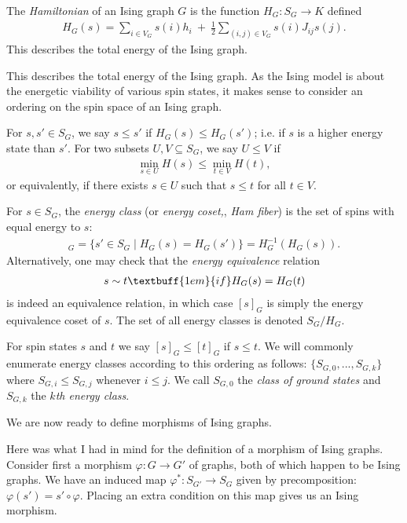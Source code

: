 \begin{defn}\label{defn:hamiltonian}
	The \emph{Hamiltonian} of an Ising graph $G$ is the function $H_G:S_G\to K$ defined
	\begin{align*}
		H_G(s) = \sum_{i \in V_G} s(i)h_i ~+~ \frac{1}{2} \sum_{(i,j) \in V_G} s(i)J_{ij}s(j).
	\end{align*}
	This describes the total energy of the Ising graph.
\end{defn}
This describes the total energy of the Ising graph. As the Ising model is about the energetic viability of various spin states, it makes sense to consider an ordering on the spin space of an Ising graph.
\begin{defn}\label{defn:ordering-on-spins}
	For $s,s' \in S_G$, we say $s\leq s'$ if $H_G(s) \leq H_G(s')$; i.e. if $s$ is a higher energy state than $s'$. For two subsets $U,V \subseteq S_G$, we say $U\leq V$ if
	\begin{align*}
		\min_{s \in U} H(s) \leq \min_{t\in V} H(t),
	\end{align*}
	or equivalently, if there exists $s \in U$ such that $s \leq t$ for all $t \in V$.
\end{defn}
\begin{defn}\label{defn:energy-states}
	For $s\in S_G$, the \emph{energy class} (or \emph{energy coset,}, \emph{Ham fiber}) is the set of spins with equal energy to $s$:
	\begin{align*}
		[s]_{G} = \{s' \in S_G \mid H_G(s) = H_G(s')\} = H_{G}^{-1}(H_G(s)).
	\end{align*}
	Alternatively, one may check that the \emph{energy equivalence} relation
	\begin{align*}
		s \sim t \textbuff{1em}{if} H_G(s) = H_G(t)
	\end{align*}
	is indeed an equivalence relation, in which case $[s]_G$ is simply the energy equivalence coset of $s$. The set of all energy classes is denoted $S_G/H_G$.

	For spin states $s$ and $t$ we say $[s]_G\leq [t]_G$ if $s \leq t$. We will commonly enumerate energy classes according to this ordering as follows: $\{S_{G,0},...,S_{G,k}\}$ where $S_{G,i}\leq S_{G,j}$ whenever $i \leq j$. We call $S_{G,0} $ the \emph{class of ground states} and $S_{G,k}$ the \emph{$k$th energy class}.
\end{defn}

We are now ready to define morphisms of Ising graphs. 

Here was what I had in mind for the definition of a morphism of Ising graphs. Consider first a morphism $\varphi:G\to G'$ of graphs, both of which happen to be Ising graphs. We have an induced map $\varphi^*:S_{G'}\to S_G$ given by precomposition: $\varphi(s') = s'\circ \varphi$. Placing an extra condition on this map gives us an Ising morphism.

